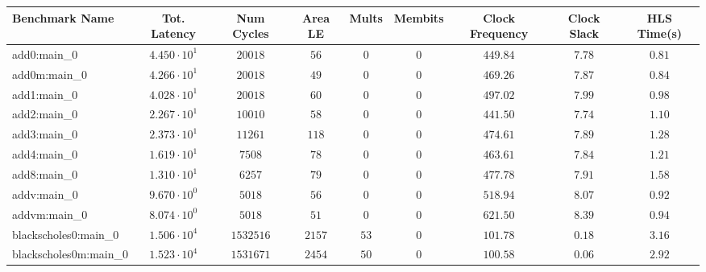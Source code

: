 \begin{tabular}{|l|c|c|c|c|c|c|c|c|}
\hline
Benchmark Name                 & Tot. Latency           & Num Cycles   & Area LE    & Mults    & Membits      & Clock Frequency & Clock Slack & HLS Time(s) \\
\hline
add0:main\_0                   & $ 4.450 \cdot 10^{1} $ & $ 20018    $ & $ 56     $ & $ 0    $ & $ 0        $ & $ 449.84      $ & $ 7.78    $ & $ 0.81    $ \\
add0m:main\_0                  & $ 4.266 \cdot 10^{1} $ & $ 20018    $ & $ 49     $ & $ 0    $ & $ 0        $ & $ 469.26      $ & $ 7.87    $ & $ 0.84    $ \\
add1:main\_0                   & $ 4.028 \cdot 10^{1} $ & $ 20018    $ & $ 60     $ & $ 0    $ & $ 0        $ & $ 497.02      $ & $ 7.99    $ & $ 0.98    $ \\
add2:main\_0                   & $ 2.267 \cdot 10^{1} $ & $ 10010    $ & $ 58     $ & $ 0    $ & $ 0        $ & $ 441.50      $ & $ 7.74    $ & $ 1.10    $ \\
add3:main\_0                   & $ 2.373 \cdot 10^{1} $ & $ 11261    $ & $ 118    $ & $ 0    $ & $ 0        $ & $ 474.61      $ & $ 7.89    $ & $ 1.28    $ \\
add4:main\_0                   & $ 1.619 \cdot 10^{1} $ & $ 7508     $ & $ 78     $ & $ 0    $ & $ 0        $ & $ 463.61      $ & $ 7.84    $ & $ 1.21    $ \\
add8:main\_0                   & $ 1.310 \cdot 10^{1} $ & $ 6257     $ & $ 79     $ & $ 0    $ & $ 0        $ & $ 477.78      $ & $ 7.91    $ & $ 1.58    $ \\
addv:main\_0                   & $ 9.670 \cdot 10^{0} $ & $ 5018     $ & $ 56     $ & $ 0    $ & $ 0        $ & $ 518.94      $ & $ 8.07    $ & $ 0.92    $ \\
addvm:main\_0                  & $ 8.074 \cdot 10^{0} $ & $ 5018     $ & $ 51     $ & $ 0    $ & $ 0        $ & $ 621.50      $ & $ 8.39    $ & $ 0.94    $ \\
blackscholes0:main\_0          & $ 1.506 \cdot 10^{4} $ & $ 1532516  $ & $ 2157   $ & $ 53   $ & $ 0        $ & $ 101.78      $ & $ 0.18    $ & $ 3.16    $ \\
blackscholes0m:main\_0         & $ 1.523 \cdot 10^{4} $ & $ 1531671  $ & $ 2454   $ & $ 50   $ & $ 0        $ & $ 100.58      $ & $ 0.06    $ & $ 2.92    $ \\

\end{tabular}
